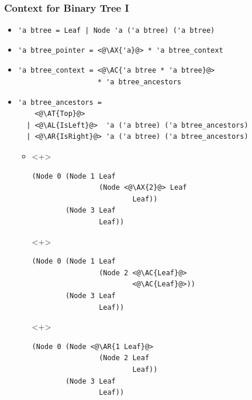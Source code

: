 \begin{frame}[fragile]
\frametitle{Context for Binary Tree I}

\newcommand{\AX}[1]{\textcolor{red}{#1}}
\newcommand{\AC}[1]{\textcolor{blue}{#1}}
\newcommand{\AL}[1]{\textcolor[RGB]{0,170,0}{#1}}
\newcommand{\AR}[1]{\textcolor{cyan}{#1}}
\newcommand{\AT}[1]{\textcolor{gray}{#1}}

\begin{itemize}
\item \lstinline.'a btree = Leaf | Node 'a ('a btree) ('a btree).

\item
\begin{lstlisting}
'a btree_pointer = <@\AX{'a}@> * 'a btree_context
\end{lstlisting}

\item
\begin{lstlisting}
'a btree_context = <@\AC{'a btree * 'a btree}@>
                   * 'a btree_ancestors
\end{lstlisting}

\item
\begin{lstlisting}
'a btree_ancestors =
    <@\AT{Top}@>
  | <@\AL{IsLeft}@>  'a ('a btree) ('a btree_ancestors)
  | <@\AR{IsRight}@> 'a ('a btree) ('a btree_ancestors)
\end{lstlisting}

\begin{itemize}
	\item
\begin{onlyenv}<+>
\begin{lstlisting}
(Node 0 (Node 1 Leaf
                (Node <@\AX{2}@> Leaf
                        Leaf))
        (Node 3 Leaf
                Leaf))
\end{lstlisting}
\end{onlyenv}

\begin{onlyenv}<+>
\begin{lstlisting}
(Node 0 (Node 1 Leaf
                (Node 2 <@\AC{Leaf}@>
                        <@\AC{Leaf}@>))
        (Node 3 Leaf
                Leaf))
\end{lstlisting}
\end{onlyenv}

\begin{onlyenv}<+>
\begin{lstlisting}
(Node 0 (Node <@\AR{1 Leaf}@>
                (Node 2 Leaf
                        Leaf))
        (Node 3 Leaf
                Leaf))
\end{lstlisting}
\end{onlyenv}


\end{itemize}
\end{itemize}
\end{frame}
